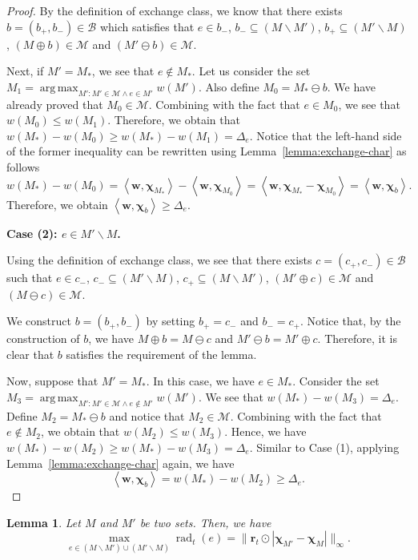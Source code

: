 \documentclass{article}
\newtheorem{lemma}{Lemma}
\newcommand{\M}{\mathcal M}
\newcommand{\B}{\mathcal B}
\newcommand{\del}{\backslash}
\DeclareMathOperator{\rad}{rad}
\DeclareMathOperator*{\argmax}{arg\,max}
\newcommand{\inn}[1]{\left\langle #1 \right\rangle}
\renewcommand{\vec}[1]{\boldsymbol{#1}}
\begin{document}
\begin{spacing}{1.1}
\begin{proof}
By the definition of exchange class, we know that 
there exists $b=(b_+, b_-) \in \B$ which satisfies that
$e\in b_-$, $b_- \subseteq (M\del M') $, $b_+\subseteq (M' \del M)$, $(M\oplus b) \in \M$ and $(M'\ominus b) \in \M$.

Next, if $M'=M_*$, we see that $e\not \in M_*$.
Let us consider the set $M_1 = \argmax_{M': M'\in \M \wedge e\in M'} w(M')$.
Also define $M_0 = M_*\ominus b$. 
We have already proved that $M_0\in \M$.  
Combining with the fact that $e\in M_0$, we see that $w(M_0) \le w(M_1)$. 
Therefore, we obtain that
$w(M_*)-w(M_0) \ge w(M_*)-w(M_1) = \Delta_e$.
Notice that the left-hand side of the former inequality can be rewritten using Lemma~\ref{lemma:exchange-char} as follows
$$
w(M_*)-w(M_0) = \inn{\vec w, \vec \chi_{M_*}}-\inn{\vec w, \vec \chi_{M_0}} = \inn{\vec w, \vec \chi_{M_*}-\vec\chi_{M_0}}
= \inn{\vec w,\vec \chi_b}.
$$
Therefore, we obtain $\inn{\vec w,\vec \chi_b} \ge \Delta_e$.

\textbf{Case (2): $e\in M'\del M$.}

Using the definition of exchange class, we see that 
there exists $c=(c_+,c_-)\in \B$ such that 
$e\in c_-$, $c_-\subseteq (M'\del M)$, $c_+\subseteq (M\del M')$, $(M'\oplus c)\in \M$
and $(M\ominus c)\in \M$.

We construct $b=(b_+,b_-)$ by setting $b_+=c_-$ and $b_-=c_+$. 
Notice that, by the construction of $b$, we have $M\oplus b = M\ominus c$ and $M'\ominus b = M'\oplus c$.
Therefore, it is clear that $b$ satisfies the requirement of the lemma.


Now, suppose that $M'=M_*$. 
In this case, we have $e\in M_*$.
Consider the set $M_3 = \argmax_{M': M'\in \M \wedge e\not \in M'} w(M')$.
We see that $w(M_*)-w(M_3)=\Delta_e$.
Define $M_2 = M_* \ominus b$ and notice that  $M_2 \in \M$.
Combining with the fact that $e\not \in M_2$, we obtain that $w(M_2) \le w(M_3)$.
Hence, we have
$w(M_*)-w(M_2) \ge w(M_*)-w(M_3)=\Delta_e$.
Similar to Case (1), applying Lemma~\ref{lemma:exchange-char} again, we have
$$
\inn{\vec w,\vec \chi_b} = w(M_*)-w(M_2) \ge \Delta_e.
$$


\end{proof}

\begin{lemma}
\label{lemma:max}
Let $M$ and $M'$ be two sets. 
Then, we have 
$$ \max_{e \in (M\del M') \cup (M'\del M)} \rad_t(e) = \big\|\vec r_t \odot |\vec \chi_{M'} - \vec \chi_M| \big\|_\infty.$$
\end{lemma}


\end{spacing}
\end{document}
